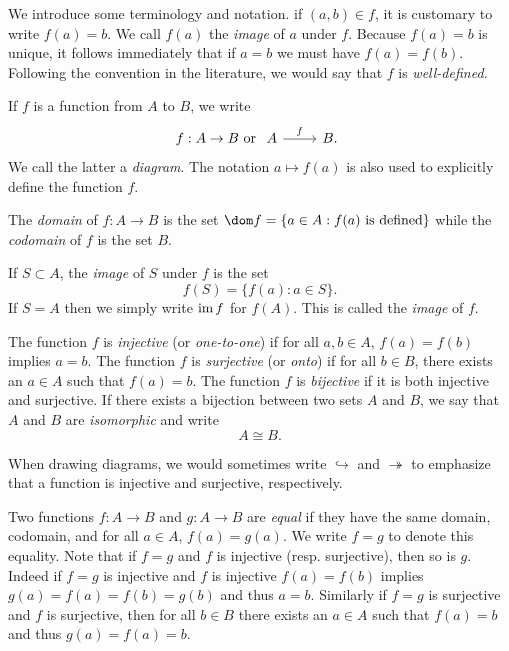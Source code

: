 \begin{sectionthm}
    We introduce some terminology and notation. if \((a, b) \in f\), it is
    customary to write \(f(a) = b\). We call \(f(a)\) the \emph{image} of \(a\)
    under \(f\). Because \(f(a) = b\) is unique, it follows immediately that if
    \(a = b\) we must have \(f(a) = f(b)\). Following the convention in the
    literature, we would say that \(f\) is \emph{well-defined.}

    If \(f\) is a function from \(A\) to \(B\), we write
    \[
        f: A \to B \text{ or } \begin{tikzcd}
            A \arrow[r, "f"] & B.
        \end{tikzcd}
    \]
    We call the latter a \emph{diagram}. The notation \(a \mapsto f(a)\) is also
    used to explicitly define the function \(f\).

    The \emph{domain} of \(f : A \to B\) is the set \(\dom f = \{a \in A : f(a)
    \text{ is defined}\}\) while the \emph{codomain} of \(f\) is the set \(B\). 

    If \(S \subset A\), the \emph{image} of \(S\) under \(f\) is the set
    \[
        f(S) = \{f(a) : a \in S\}.
    \]
    If \(S = A\) then we simply write \(\operatorname{im} f\) for \(f(A)\). This is called
    the \emph{image} of \(f\).
\end{sectionthm}

\begin{sectionthm}
    The function \(f\) is \emph{injective} (or \emph{one-to-one}) if for all
    \(a, b \in A\), \(f(a) = f(b)\) implies \(a = b\). The function \(f\) is
    \emph{surjective} (or \emph{onto}) if for all \(b \in B\), there exists an
    \(a \in A\) such that \(f(a) = b\). The function \(f\) is \emph{bijective}
    if it is both injective and surjective. If there exists a bijection between
    two sets \(A\) and \(B\), we say that \(A\) and \(B\) are \emph{isomorphic}
    and write
    \[
        A \cong B.
    \]

    When drawing diagrams, we would sometimes write \(\hookrightarrow\) and
    \(\twoheadrightarrow\) to emphasize that a function is injective and
    surjective, respectively.
\end{sectionthm}

\begin{remark}
    Two functions \(f: A \to B\) and \(g: A \to B\) are \emph{equal} if they
    have the same domain, codomain, and for all \(a \in A\), \(f(a) = g(a)\). We
    write \(f = g\) to denote this equality. Note that if \(f = g\) and \(f\) is
    injective (resp. surjective), then so is \(g\). Indeed if \(f = g\) is
    injective and \(f\) is injective \(f(a) = f(b)\) implies \(g(a) = f(a) =
    f(b) = g(b)\) and thus \(a = b\). Similarly if \(f = g\) is surjective and
    \(f\) is surjective, then for all \(b \in B\) there exists an \(a \in A\)
    such that \(f(a) = b\) and thus \(g(a) = f(a) = b\).
\end{remark}

